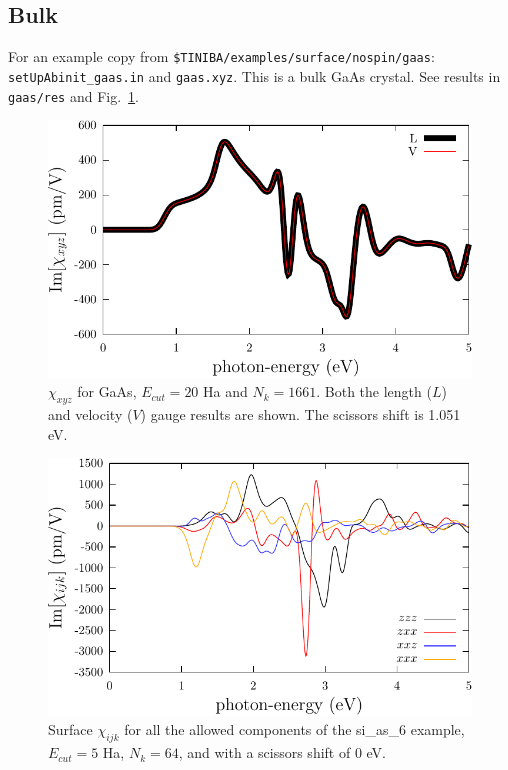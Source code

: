 \documentclass[12pt,leqno]{article}
\numberwithin{equation}{section}
\begin{document}
\subsection{Bulk} 
For an example copy from \verb=$TINIBA/examples/surface/nospin/gaas=:\\
\verb=setUpAbinit_gaas.in= and \verb=gaas.xyz=. This is a
bulk GaAs crystal. See results in \verb=gaas/res= and Fig.~\ref{shg-bulk}.
\begin{figure}[t]
\begin{center}
\includegraphics[scale=0.5]{plots/shg-bulk}
\end{center}
\caption{$\chi_{xyz}$ for GaAs, $E_{cut}=20$ Ha and $N_k=1661$. Both
  the length ($L$) and velocity ($V$) gauge results are shown.
The scissors shift is 1.051 eV.
}
\label{shg-bulk}
\end{figure}
\begin{figure}[t]
\begin{center}
\includegraphics[scale=0.5]{plots/shg-surface}
\end{center}
\caption{Surface $\chi_{ijk}$ for all the allowed components of the
  si\_as\_6 example, $E_{cut}=5$ 
  Ha, $N_k=64$, and with a scissors shift of 0 eV. 
}
\label{shg-surface}
\end{figure}
\end{document}
